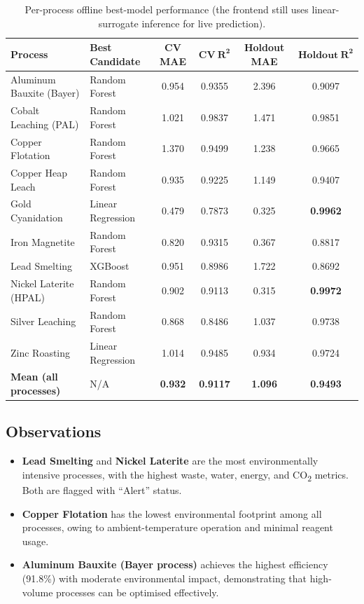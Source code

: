 \documentclass[12pt,a4paper]{report}
\begin{document}
\begin{table}[H]
\centering
\caption{Per-process offline best-model performance (the frontend still uses linear-surrogate inference for live prediction).}
\label{tab:model_results}
\footnotesize
\begin{tabular}{@{} l l c c c c @{}}
\toprule
\textbf{Process} & \textbf{Best Candidate} & \textbf{CV MAE} & $\boldsymbol{CV\ R^2}$ & \textbf{Holdout MAE} & $\boldsymbol{Holdout\ R^2}$ \\
\midrule
Aluminum Bauxite (Bayer)  & Random Forest    & 0.954 & 0.9355 & 2.396 & 0.9097 \\
Cobalt Leaching (PAL)     & Random Forest    & 1.021 & 0.9837 & 1.471 & 0.9851 \\
Copper Flotation          & Random Forest    & 1.370 & 0.9499 & 1.238 & 0.9665 \\
Copper Heap Leach         & Random Forest    & 0.935 & 0.9225 & 1.149 & 0.9407 \\
Gold Cyanidation          & Linear Regression & 0.479 & 0.7873 & 0.325 & \textbf{0.9962} \\
Iron Magnetite            & Random Forest    & 0.820 & 0.9315 & 0.367 & 0.8817 \\
Lead Smelting             & XGBoost          & 0.951 & 0.8986 & 1.722 & 0.8692 \\
Nickel Laterite (HPAL)    & Random Forest    & 0.902 & 0.9113 & 0.315 & \textbf{0.9972} \\
Silver Leaching           & Random Forest    & 0.868 & 0.8486 & 1.037 & 0.9738 \\
Zinc Roasting             & Linear Regression & 1.014 & 0.9485 & 0.934 & 0.9724 \\
\midrule
\textbf{Mean (all processes)} & N/A & \textbf{0.932} & \textbf{0.9117} & \textbf{1.096} & \textbf{0.9493} \\
\bottomrule
\end{tabular}
\end{table}

\subsection{Observations}

\begin{itemize}
  \item \textbf{Lead Smelting} and \textbf{Nickel Laterite} are the most environmentally intensive processes, with the highest waste, water, energy, and CO\textsubscript{2} metrics. Both are flagged with ``Alert'' status.
  \item \textbf{Copper Flotation} has the lowest environmental footprint among all processes, owing to ambient-temperature operation and minimal reagent usage.
  \item \textbf{Aluminum Bauxite (Bayer process)} achieves the highest efficiency (91.8\%) with moderate environmental impact, demonstrating that high-volume processes can be optimised effectively.
\end{itemize}
\end{document}
